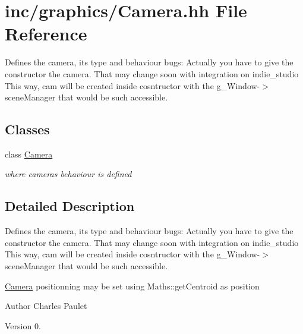 \hypertarget{Camera_8hh}{}\section{inc/graphics/\+Camera.hh File Reference}
\label{Camera_8hh}


Defines the camera, its type and behaviour bugs\+: Actually you have to give the constructor the camera. That may change soon with integration on indie\+\_\+studio This way, cam will be created inside cosntructor with the g\+\_\+\+Window-\/$>$scene\+Manager that would be such accessible.  


\subsection*{Classes}
\begin{DoxyCompactItemize}
\item 
class \hyperlink{classCamera}{Camera}
\begin{DoxyCompactList}\small\item\em where cameras behaviour is defined \end{DoxyCompactList}\end{DoxyCompactItemize}


\subsection{Detailed Description}
Defines the camera, its type and behaviour bugs\+: Actually you have to give the constructor the camera. That may change soon with integration on indie\+\_\+studio This way, cam will be created inside cosntructor with the g\+\_\+\+Window-\/$>$scene\+Manager that would be such accessible. 

\hyperlink{classCamera}{Camera} positionning may be set using Maths\+::get\+Centroid as position

\begin{DoxyAuthor}{Author}
Charles Paulet 
\end{DoxyAuthor}
\begin{DoxyVersion}{Version}
0. 
\end{DoxyVersion}
